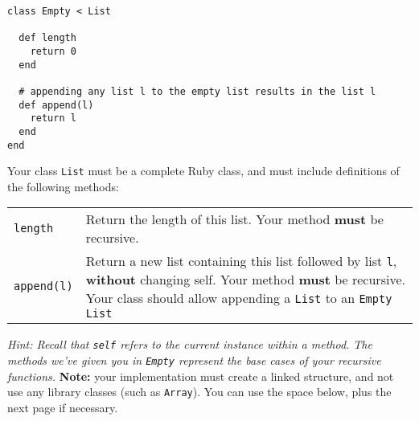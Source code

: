 \documentclass[11pt]{article}
\begin{document}
\begin{enumerate}
          \begin{verbatim}
class Empty < List

  def length
    return 0
  end

  # appending any list l to the empty list results in the list l
  def append(l)
    return l
  end
end\end{verbatim}

          \vspace{-1.25mm}
          
          Your class \texttt{List} must be a complete Ruby class, and
          must include definitions of the following methods:

          \vspace{-3.25mm}

          \begin{center}

            \begin{tabular}{lp{5.85in}@{}}

              \texttt{length}
                & Return the length of this list.  Your method \textbf{must}
                  be recursive. \\

              \texttt{append(l)}
                & Return a new list containing this list followed by list
                  \texttt{l}, \textbf{without} changing self.  Your method
                  \textbf{must} be recursive.  Your class should allow
                  appending a \texttt{List} to an \texttt{Empty List}

            \end{tabular}

          \end{center}

          \vspace{-7.5mm}

          \textit{Hint: Recall that \emph{\texttt{self}} refers to the
          current instance within a method.  The methods we've given
          you in \emph{\texttt{Empty}} represent the base cases of
          your recursive functions.}  \textbf{Note:} your
          implementation must create a linked structure, and not use any
          library classes (such as \texttt{Array}).  You can use the space
          below, plus the next page if necessary.

          \vspace{5in}

          \pagebreak

          ~

          \pagebreak


  \end{enumerate}

  \label{end}
\end{document}
